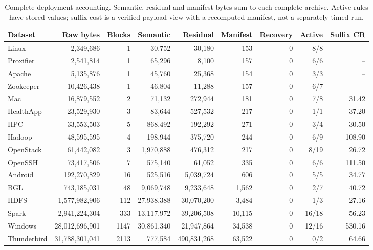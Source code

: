 \begin{longtable}{lrrrrrrrr}
\caption{Complete deployment accounting. Semantic, residual and manifest bytes sum to each complete archive. Active rules have stored values; suffix cost is a verified payload view with a recomputed manifest, not a separately timed run.}\\
\toprule
Dataset & Raw bytes & Blocks & Semantic & Residual & Manifest & Recovery & Active & Suffix CR \\ \midrule\endhead
Linux & 2,349,686 & 1 & 30,752 & 30,180 & 153 & 0 & 8/8 & -- \\
Proxifier & 2,541,814 & 1 & 65,296 & 8,100 & 157 & 0 & 6/6 & -- \\
Apache & 5,135,876 & 1 & 45,760 & 25,368 & 154 & 0 & 3/3 & -- \\
Zookeeper & 10,426,438 & 1 & 46,804 & 11,288 & 157 & 0 & 6/7 & -- \\
Mac & 16,879,552 & 2 & 71,132 & 272,944 & 181 & 0 & 7/8 & 31.42 \\
HealthApp & 23,529,930 & 3 & 83,644 & 527,532 & 217 & 0 & 1/1 & 37.20 \\
HPC & 33,553,503 & 5 & 868,492 & 192,292 & 271 & 0 & 3/4 & 30.50 \\
Hadoop & 48,595,595 & 4 & 198,944 & 375,720 & 244 & 0 & 6/9 & 108.90 \\
OpenStack & 61,442,082 & 3 & 1,970,888 & 476,312 & 217 & 0 & 8/19 & 26.72 \\
OpenSSH & 73,417,506 & 7 & 575,140 & 61,052 & 335 & 0 & 6/6 & 111.50 \\
Android & 192,270,829 & 16 & 525,516 & 5,039,724 & 606 & 0 & 5/5 & 34.77 \\
BGL & 743,185,031 & 48 & 9,069,748 & 9,233,648 & 1,562 & 0 & 2/7 & 40.72 \\
HDFS & 1,577,982,906 & 112 & 27,938,388 & 30,070,200 & 3,484 & 0 & 1/3 & 27.16 \\
Spark & 2,941,224,304 & 333 & 13,117,972 & 39,206,508 & 10,115 & 0 & 16/18 & 56.23 \\
Windows & 28,012,696,901 & 1147 & 30,861,340 & 21,947,864 & 34,538 & 0 & 12/16 & 530.16 \\
Thunderbird & 31,788,301,041 & 2113 & 777,584 & 490,831,268 & 63,522 & 0 & 0/2 & 64.66 \\
\bottomrule\end{longtable}
